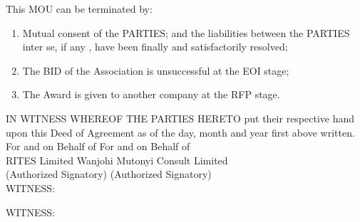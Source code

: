 		This  MOU can be terminated by:
\begin{enumerate}
	\begin{enumerate}

		\item Mutual consent of the PARTIES; and the liabilities between the PARTIES inter se, if any , have been finally and satisfactorily resolved;
		\item The BID of the Association is unsuccessful at the EOI stage;
		\item The Award is given to another company at the RFP stage.
		
	\end{enumerate}
\end{enumerate}		


      
IN WITNESS WHEREOF THE PARTIES HERETO put their respective hand upon this Deed of Agreement as of the day, month and year first above written.\\


For and on Behalf of \hfill For and on Behalf of \\
RITES Limited    \hfill  Wanjohi Mutonyi Consult Limited \\



(Authorized Signatory) \hfill  (Authorized Signatory)\\



WITNESS:



WITNESS:
